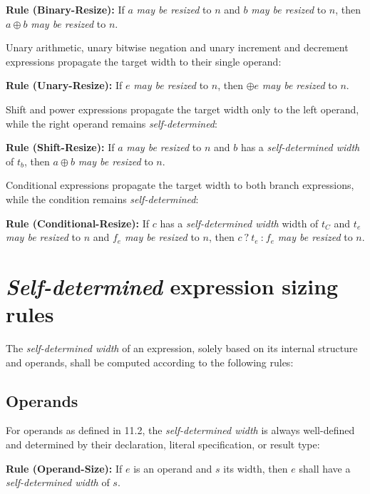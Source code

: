 \documentclass{article}
\newcommand{\sds}{\emph{self-determined width}}
\newcommand{\mbr}{\emph{may be resized}}
\newenvironment{typingrule}[1]%
{\par\noindent\textbf{Rule (#1):} }%
{\par}
\begin{document}
\begin{typingrule}{Binary-Resize}
  If $a$ \mbr{} to $n$ and $b$ \mbr{} to $n$, then $a \oplus b$ \mbr{} to $n$.
\end{typingrule}

Unary arithmetic, unary bitwise negation and unary increment and decrement
expressions propagate the target width to their single operand:

\begin{typingrule}{Unary-Resize}
  If $e$ \mbr{} to $n$, then $\oplus e$ \mbr{} to $n$.
\end{typingrule}

Shift and power expressions propagate the target width only to the left operand,
while the right operand remains \emph{self-determined}:

\begin{typingrule}{Shift-Resize}
  If $a$ \mbr{} to $n$ and $b$ has a \sds{} of $t_{b}$, then
  $a \oplus b$ \mbr{} to $n$.
\end{typingrule}

Conditional expressions propagate the target width to both branch expressions,
while the condition remains \emph{self-determined}:

\begin{typingrule}{Conditional-Resize}
  If $c$ has a \sds{} width of $t_{C}$ and $t_{e}$ \mbr{} to $n$ and $f_{e}$
  \mbr{} to $n$, then $c~\texttt{?}~t_{e}~\texttt{:}~f_{e}$ \mbr{} to $n$.
\end{typingrule}

\section{\emph{Self-determined} expression sizing rules}%
\label{self-determined}

The \sds{} of an expression, solely based on its internal
structure and operands, shall be computed according to the following rules:

\subsection{Operands}%

For operands as defined in 11.2, the \sds{} is always
well-defined and determined by their declaration, literal specification, or
result type:

\begin{typingrule}{Operand-Size}
  If $e$ is an operand and $s$ its width, then $e$ shall have a \sds{} of $s$.
\end{typingrule}
\end{document}
